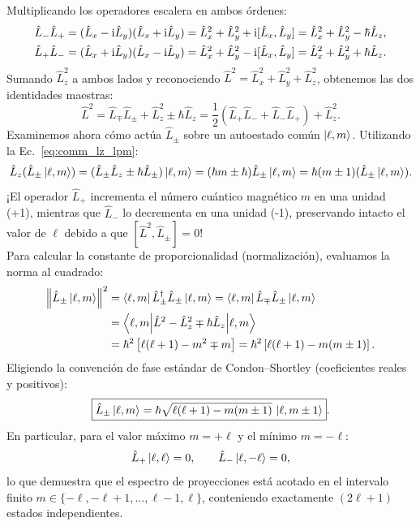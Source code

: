 Multiplicando los operadores escalera en ambos órdenes:
\begin{align}
    \hat{L}_-\hat{L}_+ &= (\hat{L}_x - \mathrm{i}\hat{L}_y)(\hat{L}_x + \mathrm{i}\hat{L}_y) = \hat{L}_x^2 + \hat{L}_y^2 + \mathrm{i}[\hat{L}_x, \hat{L}_y] = \hat{L}_x^2 + \hat{L}_y^2 - \hbar\hat{L}_z, \\
    \hat{L}_+\hat{L}_- &= (\hat{L}_x + \mathrm{i}\hat{L}_y)(\hat{L}_x - \mathrm{i}\hat{L}_y) = \hat{L}_x^2 + \hat{L}_y^2 - \mathrm{i}[\hat{L}_x, \hat{L}_y] = \hat{L}_x^2 + \hat{L}_y^2 + \hbar\hat{L}_z.
\end{align}
Sumando $\hat{L}_z^2$ a ambos lados y reconociendo $\hat{L}^2 = \hat{L}_x^2 + \hat{L}_y^2 + \hat{L}_z^2$, obtenemos las dos identidades maestras:
\begin{equation}
    \boxed{\hat{L}^2 = \hat{L}_\mp\hat{L}_\pm + \hat{L}_z^2 \pm \hbar\hat{L}_z = \frac{1}{2}(\hat{L}_+\hat{L}_- + \hat{L}_-\hat{L}_+) + \hat{L}_z^2}.
    \label{eq:l2_ladder_decomp}
\end{equation}
Examinemos ahora cómo actúa $\hat{L}_\pm$ sobre un autoestado común $\left| \ell, m \right\rangle$. Utilizando la Ec.~\eqref{eq:comm_lz_lpm}:
\begin{equation}
    \hat{L}_z (\hat{L}_\pm\left| \ell, m \right\rangle) = (\hat{L}_\pm\hat{L}_z \pm \hbar\hat{L}_\pm)\left| \ell, m \right\rangle = (\hbar m \pm \hbar)\hat{L}_\pm\left| \ell, m \right\rangle = \hbar(m \pm 1)(\hat{L}_\pm\left| \ell, m \right\rangle).
\end{equation}
¡El operador $\hat{L}_+$ incrementa el número cuántico magnético $m$ en una unidad (+1), mientras que $\hat{L}_-$ lo decrementa en una unidad (-1), preservando intacto el valor de $\ell$ debido a que $[\hat{L}^2, \hat{L}_\pm] = 0$!\\
Para calcular la constante de proporcionalidad (normalización), evaluamos la norma al cuadrado:
\begin{align}
    \left\| \hat{L}_\pm\left| \ell, m \right\rangle \right\|^2 &= \left\langle \ell, m \right|\hat{L}_\pm^\dagger\hat{L}_\pm\left| \ell, m \right\rangle = \left\langle \ell, m \right|\hat{L}_\mp\hat{L}_\pm\left| \ell, m \right\rangle \nonumber\\
    &= \left\langle \ell, m \middle| \hat{L}^2 - \hat{L}_z^2 \mp \hbar\hat{L}_z \middle| \ell, m \right\rangle \nonumber\\
    &= \hbar^2\left[\ell(\ell+1) - m^2 \mp m\right] = \hbar^2\left[\ell(\ell+1) - m(m \pm 1)\right].
\end{align}
Eligiendo la convención de fase estándar de Condon--Shortley (coeficientes reales y positivos):
\begin{equation}
    \boxed{\hat{L}_\pm\left| \ell, m \right\rangle = \hbar\sqrt{\ell(\ell+1) - m(m \pm 1)}\,\left| \ell, m \pm 1 \right\rangle}.
    \label{eq:ladder_action}
\end{equation}
En particular, para el valor máximo $m = +\ell$ y el mínimo $m = -\ell$:
\begin{equation}
    \hat{L}_+\left| \ell, \ell \right\rangle = 0, \qquad \hat{L}_-\left| \ell, -\ell \right\rangle = 0,
\end{equation}
lo que demuestra que el espectro de proyecciones está acotado en el intervalo finito $m \in \{-\ell, -\ell+1, \dots, \ell-1, \ell\}$, conteniendo exactamente $(2\ell+1)$ estados independientes.

